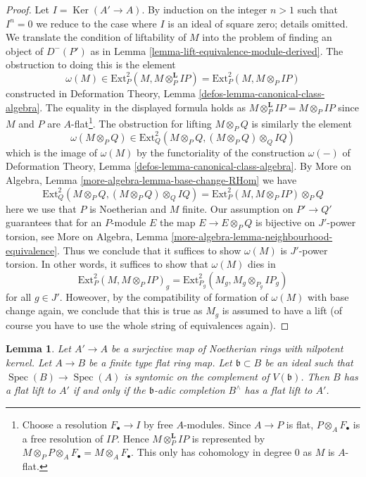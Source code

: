\documentclass{stacks-project}
\theoremstyle{plain}
\newtheorem{lemma}[subsection]{Lemma}
\theoremstyle{definition}
\theoremstyle{remark}
\numberwithin{equation}{subsection}
\def\Spec{\mathop{\mathrm{Spec}}}
\def\Ker{\mathop{\mathrm{Ker}}}
\begin{document}
\begin{proof}
Let $I = \Ker(A' \to A)$. By induction on the integer $n > 1$
such that $I^n = 0$ we reduce to the case where $I$ is an ideal
of square zero; details omitted.
We translate the condition of liftability of
$M$ into the problem of finding an object of $D^-(P')$ as in
Lemma \ref{lemma-lift-equivalence-module-derived}.
The obstruction to doing this is the element
$$
\omega(M) \in \text{Ext}^2_P(M, M \otimes_P^\mathbf{L} IP) =
\text{Ext}^2_P(M, M \otimes_P IP)
$$
constructed in
Deformation Theory, Lemma \ref{defos-lemma-canonical-class-algebra}.
The equality in the displayed formula holds as
$M \otimes_P^\mathbf{L} IP = M \otimes_P IP$
since $M$ and $P$ are $A$-flat\footnote{Choose a resolution
$F_\bullet \to I$ by free $A$-modules. Since $A \to P$ is flat,
$P \otimes_A F_\bullet$ is a free resolution of $IP$.
Hence $M \otimes_P^\mathbf{L} IP$ is represented by
$M \otimes_P P \otimes_A F_\bullet = M \otimes_A F_\bullet$.
This only has cohomology in degree $0$ as $M$ is $A$-flat.}.
The obstruction for lifting $M \otimes_P Q$ is similarly
the element
$$
\omega(M \otimes_P Q) \in
\text{Ext}^2_Q(M \otimes_P Q, (M \otimes_P Q) \otimes_Q IQ)
$$
which is the image of $\omega(M)$ by the functoriality
of the construction $\omega(-)$ of
Deformation Theory, Lemma \ref{defos-lemma-canonical-class-algebra}.
By More on Algebra, Lemma \ref{more-algebra-lemma-base-change-RHom}
we have
$$
\text{Ext}^2_Q(M \otimes_P Q, (M \otimes_P Q) \otimes_Q IQ) =
\text{Ext}^2_P(M, M \otimes_P IP) \otimes_P Q
$$
here we use that $P$ is Noetherian and $M$ finite.
Our assumption on $P' \to Q'$ guarantees that for an $P$-module $E$
the map $E \to E \otimes_P Q$ is bijective on $J'$-power torsion, see
More on Algebra, Lemma
\ref{more-algebra-lemma-neighbourhood-equivalence}.
Thus we conclude that it suffices to show $\omega(M)$
is $J'$-power torsion. In other words, it suffices to show that
$\omega(M)$ dies in
$$
\text{Ext}^2_P(M, M \otimes_P IP)_g =
\text{Ext}^2_{P_g}(M_g, M_g \otimes_{P_g} IP_g)
$$
for all $g \in J'$. Howeover, by the compatibility of formation of $\omega(M)$
with base change again, we conclude that this is true as $M_g$
is assumed to have a lift (of course you have to use the whole
string of equivalences again).
\end{proof}

\begin{lemma}
\label{lemma-lift-equivalence}
Let $A' \to A$ be a surjective map of Noetherian rings with nilpotent kernel.
Let $A \to B$ be a finite type flat ring map.
Let $\mathfrak b \subset B$ be an ideal such that
$\Spec(B) \to \Spec(A)$ is syntomic on the complement of $V(\mathfrak b)$.
Then $B$ has a flat lift to $A'$ if and only if the $\mathfrak b$-adic
completion $B^\wedge$ has a flat lift to $A'$.
\end{lemma}
\end{document}
